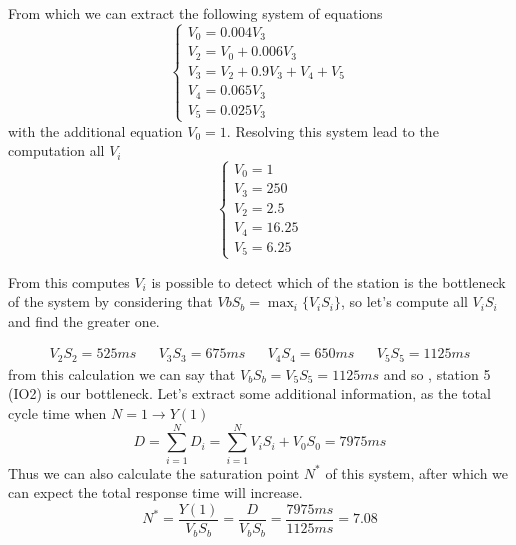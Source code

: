 \documentclass[12pt,a4paper]{article}
\begin{document}
From which we can extract the following system of equations
\begin{displaymath}
    \begin{cases}
        V_0=0.004V_3           \\
        V_2=V_0+0.006V_3       \\
        V_3=V_2+0.9V_3+V_4+V_5 \\
        V_4=0.065V_3           \\
        V_5= 0.025V_3
    \end{cases}
\end{displaymath}
with the additional equation $V_0=1$. Resolving this system lead to the computation
all $V_i$
\begin{displaymath}
    \begin{cases}
        V_0=1     \\
        V_3=250   \\
        V_2=2.5   \\
        V_4=16.25 \\
        V_5=6.25
    \end{cases}
\end{displaymath}

From this computes $V_i$ is possible to detect which of the station is the bottleneck of the system
by considering that $VbS_b= \max_i\{V_iS_i\}$, so let's compute all $V_iS_i$ and find
the greater one.

\begin{displaymath}
    \begin{aligned}
        V_2S_2= 525ms &  & V_3S_3=675ms &  & V_4S_4=650ms &  & V_5S_5= 1125ms
    \end{aligned}
\end{displaymath}
from this calculation we can say that $V_bS_b=V_5S_5=1125ms$ and so , station 5 (IO2) is
our bottleneck. Let's extract some additional information, as the total cycle time when $N=1 \rightarrow Y(1)$
\begin{displaymath}
    D=\sum_{i=1}^{N}D_i=\sum_{i=1}^{N}V_iS_i + V_0S_0=7975ms
\end{displaymath}
Thus we can also calculate the saturation point $N^*$ of this system, after which we can expect
the total response time will increase.
\begin{displaymath}
    N^*=\frac{Y(1)}{V_bS_b}=\frac{D}{V_bS_b}=\frac{7975ms}{1125ms}=7.08
\end{displaymath}
\end{document}
